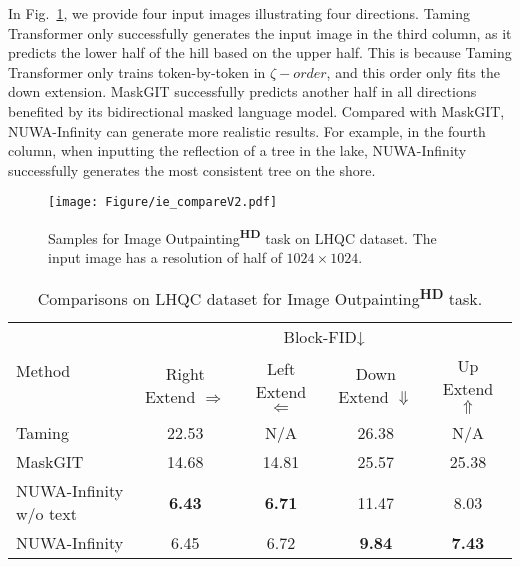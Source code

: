\documentclass{article}
\begin{document}
In Fig.~\ref{fig:vis_ie}, we provide four input images illustrating four directions. Taming Transformer only successfully generates the input image in the third column, as it predicts the lower half of the hill based on the upper half. This is because Taming Transformer only trains token-by-token in $\zeta-order$, and this order only fits the down extension. MaskGIT successfully predicts another half in all directions benefited by its bidirectional masked language model. Compared with MaskGIT, NUWA-Infinity can generate more realistic results. For example, in the fourth column, when inputting the reflection of a tree in the lake, NUWA-Infinity successfully generates the most consistent tree on the shore.
\begin{figure}[t!]
    \centering
    \texttt{[image: Figure/ie\_compareV2.pdf]}
    \caption{Samples for Image Outpainting\textsuperscript{\textbf{HD}} task on LHQC dataset. The input image has a resolution of half of $1024\times 1024$.}
    \vspace{-4mm}
    \label{fig:vis_ie}
\end{figure}
\begin{table}[htbp]
\small
\begin{tabular}{lcccc}
\toprule
\multirow{2}{*}{Method} & \multicolumn{4}{c}{Block-FID↓}                                \\ \cmidrule{2-5} 
                        & Right Extend $\Rightarrow$   & Left Extend $\Leftarrow $   & Down Extend $\Downarrow$  & Up Extend $\Uparrow$    \\ 
                        \midrule
Taming \cite{esserTamingTransformersHighResolution2021}                  & 22.53         & N/A           & 26.38         & N/A           \\
MaskGIT \cite{changMaskGITMaskedGenerative2022}                 & 14.68         & 14.81         & 25.57         & 25.38         \\
NUWA-Infinity w/o text      & \textbf{6.43} & \textbf{6.71} & 11.47         & 8.03          \\
NUWA-Infinity       & 6.45          & 6.72          & \textbf{9.84} & \textbf{7.43} \\
\bottomrule
\end{tabular}
\caption{Comparisons on LHQC dataset for Image Outpainting\textsuperscript{\textbf{HD}} task.}
\label{tab:ie}
\end{table}
\end{document}
